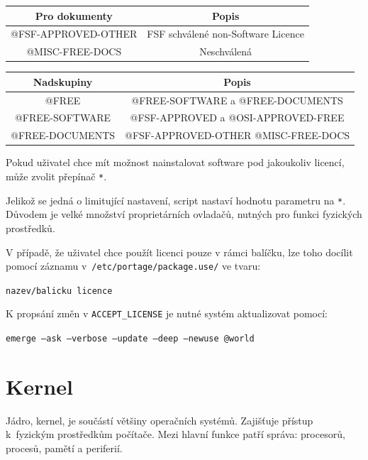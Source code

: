\documentclass[12pt,a4paper,twoside,]{article}
\begin{document}
{\begin{table}[h]
\begin{tabular}{|c|c|c|}
	\end{tabular}
\end{table}
\begin{table}[h]
	\centering
	\begin{tabular}{|c|c|}
		\hline
		Pro dokumenty & Popis \\
		\hline
		@FSF-APPROVED-OTHER & FSF schválené non-Software Licence \\
		\hline
		@MISC-FREE-DOCS & Neschválená \\
		\hline
	\end{tabular}
\end{table}
\begin{table}[h]
	\centering
	\begin{tabular}{|c|c|}
	\hline
	Nadskupiny & Popis \\
	\hline
	@FREE & @FREE-SOFTWARE a @FREE-DOCUMENTS \\
	\hline
	@FREE-SOFTWARE & @FSF-APPROVED a @OSI-APPROVED-FREE\\
	\hline
	@FREE-DOCUMENTS & @FSF-APPROVED-OTHER @MISC-FREE-DOCS\\
	\hline
	\end{tabular}
\end{table}
Pokud uživatel chce mít možnost nainstalovat software pod jakoukoliv licencí, může zvolit přepínač \texttt{*}.

Jelikož se jedná o limitující nastavení, script nastaví hodnotu parametru na \texttt{*}. Důvodem je velké množství proprietárních ovladačů, nutných pro funkci fyzických prostředků.


V případě, že uživatel chce použít licenci pouze v rámci balíčku, lze toho docílit pomocí záznamu v~\texttt{/etc/portage/package.use/} ve tvaru:

\texttt{nazev/balicku licence}

K propsání změn v \texttt{ACCEPT\_LICENSE} je nutné systém aktualizovat pomocí:

\texttt{emerge --ask --verbose --update --deep --newuse @world}


\newpage

\section{\textsf{Kernel}}
Jádro, kernel, je součástí většiny operačních systémů. Zajišťuje přístup k~fyzickým prostředkům počítače. Mezi hlavní funkce patří správa: procesorů, procesů, pamětí a periferií. 

}
\end{document}

